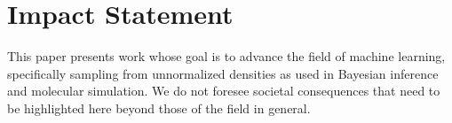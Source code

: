 \documentclass{article}
\theoremstyle{plain}
\theoremstyle{definition}
\theoremstyle{remark}
\begin{document}

\printAffiliationsAndNotice{}








\section*{Impact Statement}
This paper presents work whose goal is to advance the field of machine learning, specifically sampling from unnormalized densities as used in Bayesian inference and molecular simulation. We do not foresee societal consequences that need to be highlighted here beyond those of the field in general.




\newpage
\appendix
\onecolumn




\end{document}
